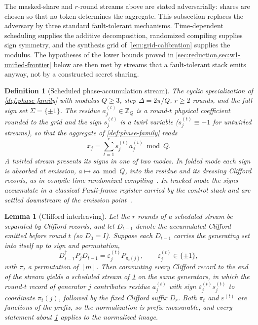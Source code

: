 \documentclass[aps,prx,reprint,floatfix,superscriptaddress]{revtex4-2}
\newtheorem{definition}{Definition}
\newtheorem{lemma}{Lemma}
\begin{document}
The masked-share and $r$-round streams above are stated adversarially:
shares are chosen so that no token determines the aggregate.  This
subsection replaces the adversary by three standard fault-tolerant
mechanisms.  Time-dependent scheduling supplies the additive
decomposition, randomized compiling supplies sign symmetry, and the
synthesis grid of \cref{lem:grid-calibration} supplies the modulus.  The
hypotheses of the lower bounds proved in
\cref{sec:reduction,sec:w1-unified-frontier} below are then met by
streams that a fault-tolerant stack emits anyway, not by a constructed
secret sharing.

\begin{definition}[Scheduled phase-accumulation stream]
\label{def:scheduled-stream}
The cyclic specialization of \cref{def:phase-family} with modulus
$Q\geq3$, step $\Delta=2\pi/Q$, $r\geq2$ rounds, and the full sign set
$\Sigma=\{\pm1\}$.  The residue $a_j^{(t)}\in\mathbb Z_Q$ is a round-$t$
physical coefficient rounded to the grid and the sign $s_j^{(t)}$ is a
twirl variable ($s_j^{(t)}\equiv+1$ for untwirled streams), so that the
aggregate of \cref{def:phase-family} reads
\begin{equation}\label{eq:scheduled-aggregate}
 x_j=\sum_{t=1}^r s_j^{(t)}a_j^{(t)}\bmod Q .
\end{equation}
A twirled stream presents its signs in one of two modes.  In
\emph{folded} mode each sign is absorbed at emission,
$a\mapsto sa\bmod Q$, into the residue and its dressing Clifford
records, as in compile-time randomized
compiling~\cite{wallman2016noise,hashim2021randomized}.  In
\emph{tracked} mode the signs accumulate in a classical Pauli-frame
register carried by the control stack and are settled downstream of the
emission point~\cite{knill2005realistically,riesebos2017pauli}.
\end{definition}

\begin{lemma}[Clifford interleaving]
\label{lem:clifford-interleaving}
Let the $r$ rounds of a scheduled stream be separated by Clifford
records, and let $D_{t-1}$ denote the accumulated Clifford emitted
before round $t$ (so $D_0=I$).  Suppose each $D_{t-1}$ carries the
generating set into itself up to sign and permutation,
\begin{equation}\label{eq:clifford-normalizes}
 D_{t-1}^\dagger P_jD_{t-1}=\varepsilon_j^{(t)}P_{\pi_t(j)},
 \qquad \varepsilon_j^{(t)}\in\{\pm1\},
\end{equation}
with $\pi_t$ a permutation of $[m]$.  Then commuting every Clifford
record to the end of the stream yields a scheduled stream of
\cref{def:scheduled-stream} on the same generators, in which the
round-$t$ record of generator $j$ contributes residue $a_j^{(t)}$ with
sign $\varepsilon_j^{(t)}s_j^{(t)}$ to coordinate $\pi_t(j)$, followed
by the fixed Clifford suffix $D_r$.  Both $\pi_t$ and
$\varepsilon^{(t)}$ are functions of the prefix, so the normalization is
prefix-measurable, and every statement about
\cref{def:scheduled-stream} applies to the normalized image.
\end{lemma}
\end{document}
